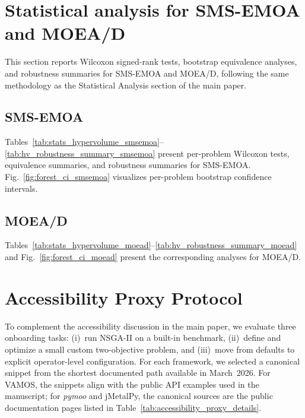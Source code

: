 \documentclass[final,5p,times,twocolumn]{elsarticle}
\newcommand{\VAMOS}{VAMOS}
\begin{document}
\section{Statistical analysis for SMS-EMOA and MOEA/D}
\label{app:stats}

This section reports Wilcoxon signed-rank tests, bootstrap equivalence analyses, and robustness summaries for SMS-EMOA and MOEA/D, following the same methodology as the Statistical Analysis section of the main paper.

\subsection{SMS-EMOA}

Tables~\ref{tab:stats_hypervolume_smsemoa}--\ref{tab:hv_robustness_summary_smsemoa} present per-problem Wilcoxon tests, equivalence summaries, and robustness summaries for SMS-EMOA. Fig.~\ref{fig:forest_ci_smsemoa} visualizes per-problem bootstrap confidence intervals.

\begingroup
\setlength{\tabcolsep}{2pt}

\endgroup

\subsection{MOEA/D}

Tables~\ref{tab:stats_hypervolume_moead}--\ref{tab:hv_robustness_summary_moead} and Fig.~\ref{fig:forest_ci_moead} present the corresponding analyses for MOEA/D.

\begingroup
\setlength{\tabcolsep}{2pt}

\endgroup

\section{Accessibility Proxy Protocol}
\label{app:accessibility_protocol}

To complement the accessibility discussion in the main paper, we evaluate three onboarding tasks: (i)~run NSGA-II on a built-in benchmark, (ii)~define and optimize a small custom two-objective problem, and (iii)~move from defaults to explicit operator-level configuration. For each framework, we selected a canonical snippet from the shortest documented path available in March~2026. For \VAMOS{}, the snippets align with the public API examples used in the manuscript; for \textit{pymoo}  and jMetalPy, the canonical sources are the public documentation pages listed in Table~\ref{tab:accessibility_proxy_details}.
\end{document}
